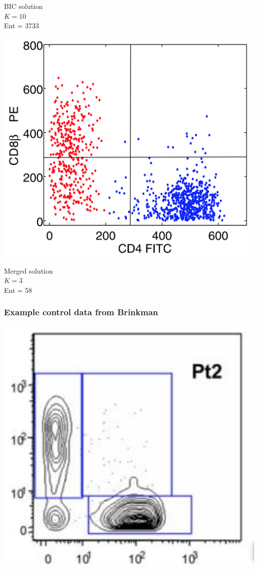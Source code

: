 \documentclass[mathserif,compress]{beamer}
\renewcommand\;{\,}
\begin{document}
\begin{frame}
\begin{center}
\begin{minipage}{0.3\linewidth}
\begin{center}
BIC solution
\\
$K = 10$
\\
Ent = 3733
\end{center}
\end{minipage}
\hfill
\begin{minipage}{0.3\linewidth}
\includegraphics[width=\linewidth]{Combined_control.png}
\begin{center}
Merged solution
\\
$K = 3$
\\
Ent = 58
\end{center}
\end{minipage}
\end{center}
\end{frame}

\begin{frame}\frametitle{Example control data from Brinkman}

\begin{center}
\includegraphics[width=0.7\linewidth]{Brinkman.png}
\end{center}
\end{frame}
\end{document}
